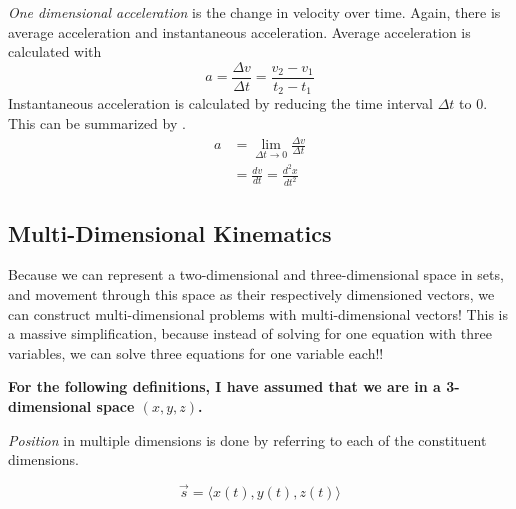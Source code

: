 \begin{definition}[Acceleration]\label{def:1-D Acceleration}
  \emph{One dimensional acceleration} is the change in velocity over time.
  Again, there is average acceleration and instantaneous acceleration.
  Average acceleration is calculated with 
  \begin{equation}\label{eq:1-D Average Acceleration}
    a = \frac{\Delta v}{\Delta t} = \frac{v_{2} - v_{1}}{t_{2} - t_{1}}
  \end{equation}
  Instantaneous acceleration is calculated by reducing the time interval $\Delta t$ to 0.
  This can be summarized by .
  \begin{equation}\label{eq:1-D Instantaneous Acceleration}
    \begin{aligned}
      a &= \lim\limits_{\Delta t \rightarrow 0} \frac{\Delta v}{\Delta t} \\
      &= \frac{dv}{dt} = \frac{d^{2}x}{dt^{2}}
    \end{aligned}
  \end{equation}
\end{definition}

\subsection{Multi-Dimensional Kinematics}\label{Multi-D Kinematics}
Because we can represent a two-dimensional and three-dimensional space in sets, and movement through this space as their respectively dimensioned vectors, we can construct multi-dimensional problems with multi-dimensional vectors!
This is a massive simplification, because instead of solving for one equation with three variables, we can solve three equations for one variable each!!

\textbf{For the following definitions, I have assumed that we are in a 3-dimensional space $(x, y, z)$.}

\begin{definition}\label{Multi-D Position}
  \emph{Position} in multiple dimensions is done by referring to each of the constituent dimensions.

  \begin{equation}\label{eq:Multi-D Position}
    \vec{s} = \bigl\langle x(t), y(t), z(t) \bigr\rangle
  \end{equation}
\end{definition}

